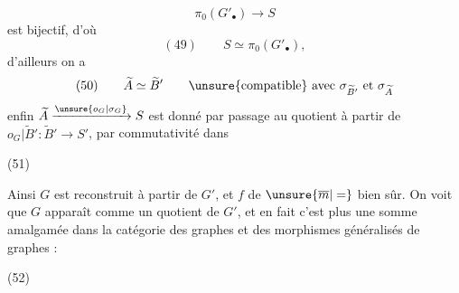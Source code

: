\[
\pi_0(G'_\bullet)\longrightarrow S
\]
est bijectif, d'où
\[
(49)\qquad S\simeq\pi_0(G'_\bullet),
\]
d'ailleurs on a
\[
(50)\qquad\widetilde A\simeq\widetilde B'\qquad\unsure{\text{compatible}}\text{ avec }\sigma_{\widetilde B'}\text{ et }\sigma_{\widetilde A}
\]
enfin $\widetilde A\xrightarrow{\unsure{o_G|\sigma_G}}S$ est donné par passage au quotient à partir de $o_G|\widetilde B':\widetilde B'\to S'$, par commutativité dans

(51)\quad{}

Ainsi $G$ est reconstruit à partir de $G'$, et $f$ de $\unsure{\overline m|=}$ bien sûr. On voit que $G$ apparaît comme un quotient de $G'$, et en fait c'est plus une somme amalgamée dans la catégorie des graphes et des morphismes généralisés de graphes :

(52)\quad{}

